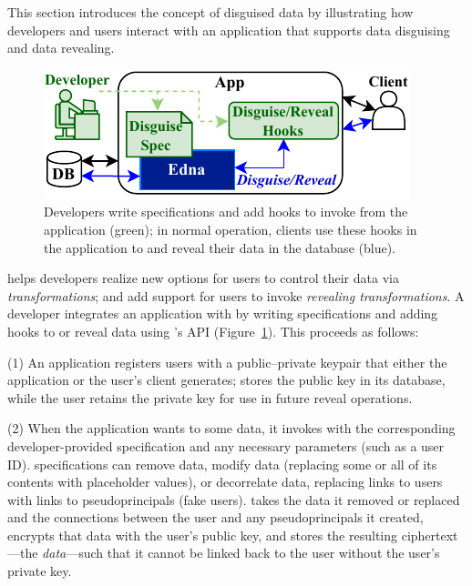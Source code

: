 This section introduces the concept of disguised data by illustrating how
developers and users interact with an application that supports 
data disguising and data revealing.
%

\begin{figure}[h!]
  \centering
    \includegraphics{figs/edna_overview}
    \caption[Developers write disguise specifications and add hooks to invoke Edna's API.]{Developers write \xx specifications and add hooks to invoke \sys
        from the application (green); in normal operation, clients use these
        hooks in the application to \xx and reveal their data in the database
        (blue).
    }
  \label{f:edna-overview}
\end{figure}
%
\sys helps developers realize new options for users to control their data
via \emph{\xxing transformations}; and add support for users to invoke
\emph{revealing transformations}.
%
A developer integrates an application with \sys by writing \xx specifications
and adding hooks to \xx or reveal data using \sys's API
(Figure~\ref{f:edna-overview}).
%
This proceeds as follows:
%

%
(1) An application registers users with a public--private keypair
that either the application or the user's client generates; \sys stores the
public key in its database, while the user retains the private key for use in
future reveal operations.
%

%
(2) When the application wants to \xx some data, it invokes \sys with the
corresponding developer-provided \xx specification and any necessary
parameters (such as a user ID).
%
\Xx specifications can remove data, modify data (replacing some or all of its
contents with placeholder values), or decorrelate data, replacing
links to users with links to pseudoprincipals (fake users).
%
%
\sys takes the data it removed or replaced and the connections between
the user and any pseudoprincipals it created, encrypts that data with the user's
public key, and stores the resulting ciphertext---the \emph{\xxed
data}---such that it cannot be linked back to the user without the user's
private key.
%
%


